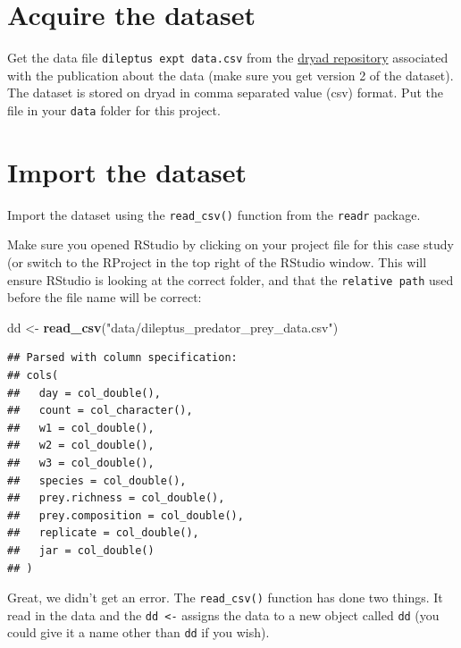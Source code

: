 \documentclass[]{book}
\newenvironment{Shaded}{\begin{snugshade}}{\end{snugshade}}
\newcommand{\KeywordTok}[1]{\textcolor[rgb]{0.13,0.29,0.53}{\textbf{#1}}}
\newcommand{\NormalTok}[1]{#1}
\newcommand{\StringTok}[1]{\textcolor[rgb]{0.31,0.60,0.02}{#1}}
\begin{document}
\hypertarget{acquire-the-dataset}{%
\section{Acquire the dataset}\label{acquire-the-dataset}}

Get the data file \texttt{dileptus\ expt\ data.csv} from the \href{https://datadryad.org/resource/doi:10.5061/dryad.7h62c8t.2}{dryad repository} associated with the publication about the data (make sure you get version 2 of the dataset). The dataset is stored on dryad in comma separated value (csv) format. Put the file in your \texttt{data} folder for this project.

\hypertarget{import-the-dataset}{%
\section{Import the dataset}\label{import-the-dataset}}

Import the dataset using the \texttt{read\_csv()} function from the \texttt{readr} package.

\begin{warning}
Make sure you opened RStudio by clicking on your project file for this
case study (or switch to the RProject in the top right of the RStudio
window. This will ensure RStudio is looking at the correct folder, and
that the \texttt{relative\ path} used before the file name will be
correct:
\end{warning}

\begin{Shaded}
\begin{Highlighting}[]
\NormalTok{dd <-}\StringTok{ }\KeywordTok{read_csv}\NormalTok{(}\StringTok{"data/dileptus_predator_prey_data.csv"}\NormalTok{)}
\end{Highlighting}
\end{Shaded}

\begin{verbatim}
## Parsed with column specification:
## cols(
##   day = col_double(),
##   count = col_character(),
##   w1 = col_double(),
##   w2 = col_double(),
##   w3 = col_double(),
##   species = col_double(),
##   prey.richness = col_double(),
##   prey.composition = col_double(),
##   replicate = col_double(),
##   jar = col_double()
## )
\end{verbatim}

Great, we didn't get an error. The \texttt{read\_csv()} function has done two things. It read in the data and the \texttt{dd\ \textless{}-} assigns the data to a new object called \texttt{dd} (you could give it a name other than \texttt{dd} if you wish).
\end{document}
